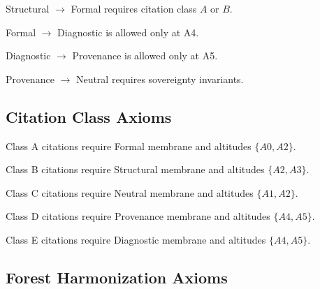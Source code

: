 \documentclass[11pt]{article}
\begin{document}
\begin{axiom}
Structural $\rightarrow$ Formal requires citation class $A$ or $B$.
\end{axiom}

\begin{axiom}
Formal $\rightarrow$ Diagnostic is allowed only at A4.
\end{axiom}

\begin{axiom}
Diagnostic $\rightarrow$ Provenance is allowed only at A5.
\end{axiom}

\begin{axiom}
Provenance $\rightarrow$ Neutral requires sovereignty invariants.
\end{axiom}

\subsection{Citation Class Axioms}

\begin{axiom}
Class A citations require Formal membrane and altitudes $\{A0, A2\}$.
\end{axiom}

\begin{axiom}
Class B citations require Structural membrane and altitudes $\{A2, A3\}$.
\end{axiom}

\begin{axiom}
Class C citations require Neutral membrane and altitudes $\{A1, A2\}$.
\end{axiom}

\begin{axiom}
Class D citations require Provenance membrane and altitudes $\{A4, A5\}$.
\end{axiom}

\begin{axiom}
Class E citations require Diagnostic membrane and altitudes $\{A4, A5\}$.
\end{axiom}

\subsection{Forest Harmonization Axioms}
\end{document}
